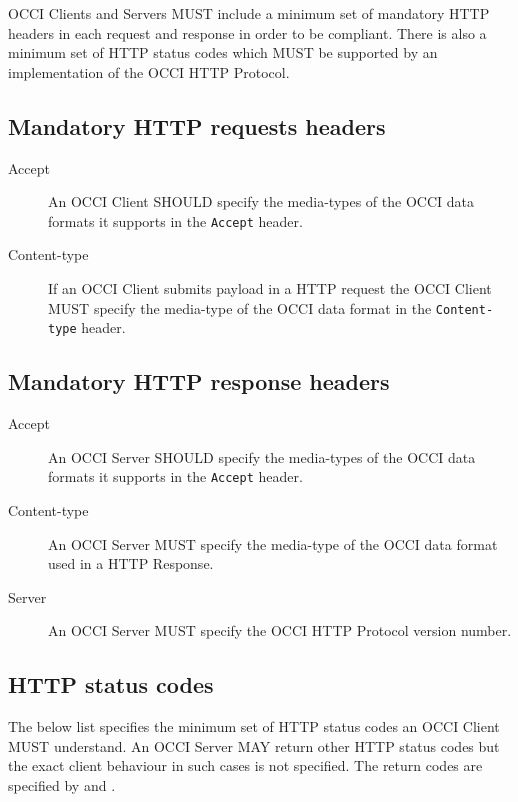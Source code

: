 \documentclass[10pt,a4paper]{article}
\begin{document}
OCCI Clients and Servers MUST include a minimum set of mandatory HTTP headers
in each request and response in order to be compliant.
There is also a minimum set of HTTP status codes which MUST be supported by
an implementation of the OCCI HTTP Protocol.

\subsection{Mandatory HTTP requests headers}

\begin{description}
\item[Accept] An OCCI Client SHOULD specify the media-types of the OCCI data
formats it supports in the {\tt Accept} header.

\item[Content-type] If an OCCI Client submits payload in a HTTP request
the OCCI Client MUST specify the media-type of the OCCI data format
in the {\tt Content-type} header.
\end{description}

\subsection{Mandatory HTTP response headers}

\begin{description}
\item[Accept] An OCCI Server SHOULD specify the media-types of the OCCI data
formats it supports in the {\tt Accept} header.
\item[Content-type] An OCCI Server MUST specify the media-type of the OCCI data
format used in a HTTP Response.
\item[Server] An OCCI Server MUST specify the OCCI HTTP Protocol version number.
\end{description}

\subsection{HTTP status codes}
The below list specifies the minimum set of HTTP status codes an OCCI Client MUST
understand. An OCCI Server MAY return other HTTP status codes but the exact client
behaviour in such cases is not specified. The return codes are specified by
\cite{rfc7231} and \cite{rfc7235}.
\end{document}
